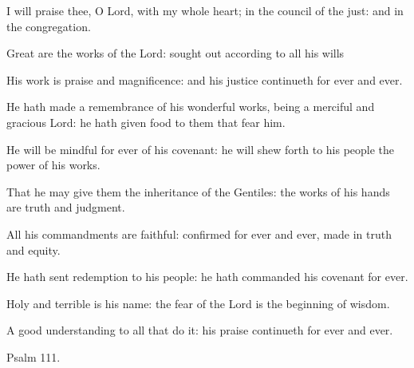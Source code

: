 \documentclass[letterpaper,12pt]{article} %
\begin{document}
\begin{parcolumns}[rulebetween]{2}
{\begin{psalmverses}[0]
\item I will praise thee, O Lord, with my whole heart; in the council of the just: and in the congregation.
\item Great are the works of the Lord: sought out according to all his wills
\item His work is praise and magnificence: and his justice continueth for ever and ever.
\item He hath made a remembrance of his wonderful works, being a merciful and gracious Lord: he hath given food to them that fear him.
\item He will be mindful for ever of his covenant: he will shew forth to his people the power of his works.
\item That he may give them the inheritance of the Gentiles: the works of his hands are truth and judgment.
\item All his commandments are faithful: confirmed for ever and ever, made in truth and equity.
\item He hath sent redemption to his people: he hath commanded his covenant for ever.
\item Holy and terrible is his name: the fear of the Lord is the beginning of wisdom.
\item A good understanding to all that do it: his praise continueth for ever and ever.
\end{psalmverses}
}
\end{parcolumns}
\pagebreak

\large
{}
\begin{center}{\Large Psalm 111.}\end{center}
\normalsize
{}
\normalsize
\end{document}
